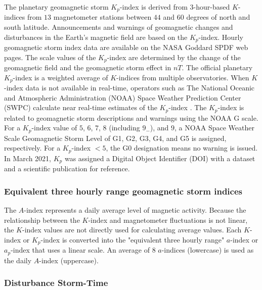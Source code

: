 \let\LaTeXcline\cline\documentclass[sn-mathphys-num]{sn-jnl}\let\cline\LaTeXcline
\begin{document}
The planetary geomagnetic storm $K_{p}$-index is derived from $3$-hour-based $K$-indices from $13$ magnetometer stations between $44$ and $60$ degrees of north and south latitude. Announcements and warnings of geomagnetic changes and disturbances in the Earth's magnetic field are based on the $K_{p}$-index. Hourly geomagnetic storm index data are available on the NASA Goddard SPDF web pages. The scale values of the $K_{p}$-index are determined by the change of the geomagnetic field and the geomagnetic storm effect in $nT$. The official planetary $K_{p}$-index is a weighted average of $K$-indices from multiple observatories. When $K$-index data is not available in real-time, operators such as The National Oceanic and Atmospheric Administration (NOAA) Space Weather Prediction Center (SWPC) calculate near real-time estimates of the $K_{p}$-index \cite{Myint2022}. The $K_{p}$-index is related to geomagnetic storm descriptions and warnings using the NOAA G scale. For a $K_{p}$-index value of $5$, $6$, $7$, $8$ (including $9_{-}$), and $9$, a NOAA Space Weather Scale Geomagnetic Storm Level of G1, G2, G3, G4, and G5 is assigned, respectively. For a $K_{p}$-index $<5$, the G0 designation means no warning is issued. In March 2021, $K_{p}$ was assigned a Digital Object Identifier (DOI) with a dataset \cite{Matzka2021a} and a scientific publication \cite{Matzka2021b} for reference.

\subsubsection{Equivalent three hourly range geomagnetic storm indices}

The $A$-index represents a daily average level of magnetic activity. Because the relationship between the $K$-index and magnetometer fluctuations is not linear, the $K$-index values are not directly used for calculating average values. Each $K$-index or $K_{p}$-index is converted into the "equivalent three hourly range" $a$-index or $a_{p}$-index that uses a linear scale. An average of $8$ $a$-indices (lowercase) is used as the daily $A$-index (uppercase).  

\subsubsection{Disturbance Storm-Time}
\end{document}
